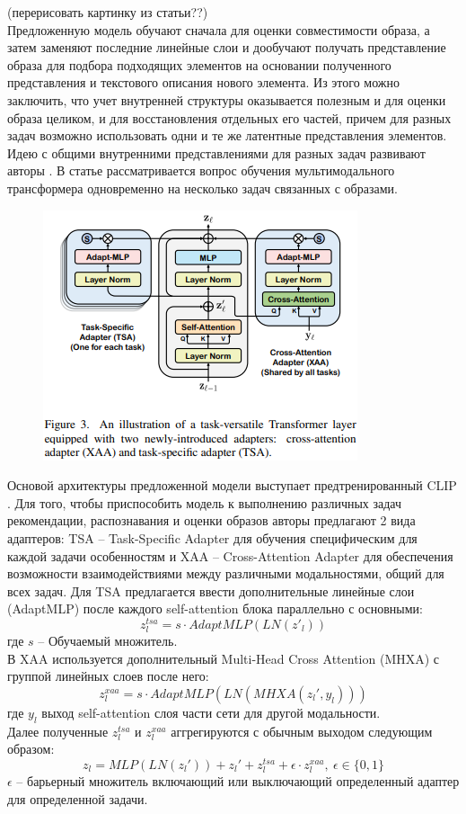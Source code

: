 \documentclass[a4paper,12pt]{article}
\begin{document}
								
				(перерисовать картинку из статьи??)\\
				
				Предложенную модель обучают сначала для оценки совместимости образа, а затем заменяют последние линейные слои и дообучают получать представление образа для подбора подходящих элементов на основании полученного представления и текстового описания нового элемента. Из этого можно заключить, что учет внутренней структуры оказывается полезным и для оценки образа целиком, и для восстановления отдельных его частей, причем для разных задач возможно использовать одни и те же латентные представления элементов. \\
				
				Идею с общими внутренними представлениями для разных задач развивают авторы \cite{https://doi.org/10.48550/arXiv.2303.02483}. В статье рассматривается вопрос обучения мультимодального трансформера одновременно на несколько задач связанных с образами. 
				
				\begin{figure}
					\includegraphics[scale = 1.0]{FAME-ViL_acrhitecture.png}
				\end{figure}
				
				Основой архитектуры предложенной модели выступает предтренированный CLIP \cite{https://doi.org/10.48550/arXiv.2103.00020}. Для того, чтобы приспособить модель к выполнению различных задач рекомендации, распознавания и оценки образов авторы предлагают 2 вида адаптеров: TSA -- Task-Specific Adapter для обучения специфическим для каждой задачи особенностям и XAA -- Cross-Attention Adapter для обеспечения возможности взаимодействиями между различными модальностями, общий для всех задач. Для TSA предлагается ввести дополнительные линейные слои (AdaptMLP) после каждого self-attention блока параллельно с основными:
				$$z_l^{tsa}=s \cdot AdaptMLP(LN(z'_l))$$
				где $s$ -- Обучаемый множитель.\\
				В XAA используется дополнительный Multi-Head Cross Attention (MHXA) с группой линейных слоев после него:
				$$z_l^{xaa} = s\cdot AdaptMLP(LN(MHXA(z_l',y_l)))$$
				где $y_l$ выход self-attention слоя части сети для другой модальности.\\
				Далее полученные $z_l^{tsa}$ и $z_l^{xaa}$ аггрегируются с обычным выходом следующим образом:
				$$z_l = MLP(LN(z_l')) + z_l'+z_l^{tsa}+\epsilon\cdot z_l^{xaa},~\epsilon\in\{0,1\}$$
				$\epsilon$ -- барьерный множитель включающий или выключающий определенный адаптер для определенной задачи. 
				
\end{document}

